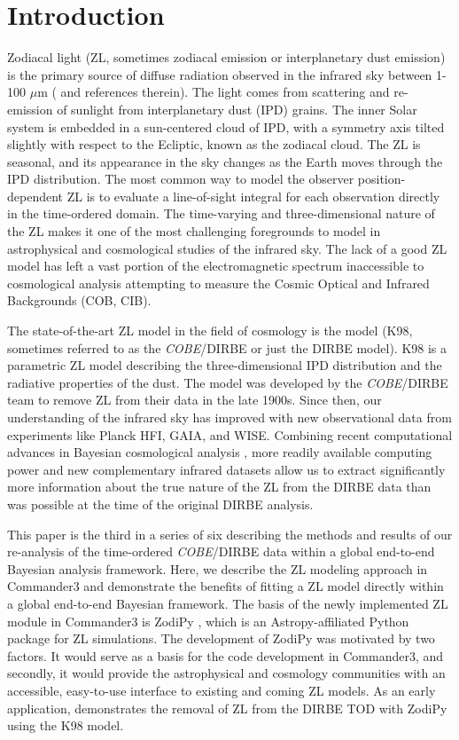 \documentclass[twocolumn]{aa}
\begin{document}
\section{Introduction}
Zodiacal light (ZL, sometimes zodiacal emission or interplanetary dust 
emission) is the primary source of diffuse radiation observed in the 
infrared sky between 1-100 $\mu$m (\cite{Leinert1998} and references 
therein). The light comes from scattering and re-emission of sunlight 
from interplanetary dust (IPD) grains. The inner Solar system is 
embedded in a sun-centered cloud of IPD, with a symmetry axis tilted 
slightly with respect to the Ecliptic, known as the zodiacal cloud. The 
ZL is seasonal, and its appearance in the sky changes as the Earth moves 
through the IPD distribution. The most common way to model the observer 
position-dependent ZL is to evaluate a line-of-sight integral for each 
observation directly in the time-ordered domain. The time-varying and 
three-dimensional nature of the ZL makes it one of the most challenging 
foregrounds to model in astrophysical and cosmological studies of the 
infrared sky. The lack of a good ZL model has left a vast portion of the 
electromagnetic spectrum inaccessible to cosmological analysis 
attempting to measure the Cosmic Optical and Infrared Backgrounds (COB, 
CIB). 

The state-of-the-art ZL model in the field of cosmology is the 
\cite{Kelsall1998} model (K98, sometimes referred to as the 
\textit{COBE}/DIRBE or just the DIRBE model). K98 is a parametric ZL 
model describing the three-dimensional IPD distribution and the 
radiative properties of the dust. The model was developed by the 
\textit{COBE}/DIRBE team to remove ZL from their data in the late 1900s.
 Since then, our understanding of the infrared sky has improved with new 
 observational data from experiments like Planck HFI, GAIA, and WISE. 
 Combining recent computational advances in Bayesian cosmological 
 analysis \citep{BP2023, Galloway2023, Watts2023}, more readily 
 available computing power and new complementary infrared datasets 
 allow us to extract significantly more information about the true 
 nature of the ZL from the DIRBE data than was possible at the time 
 of the original DIRBE analysis.

This paper is the third in a series of six describing the methods and 
results of our re-analysis of the time-ordered \textit{COBE}/DIRBE data 
within a global end-to-end Bayesian analysis framework. Here, we 
describe the ZL modeling approach in Commander3 and demonstrate the 
benefits of fitting a ZL model directly within a global end-to-end 
Bayesian framework. The basis of the newly implemented ZL module in 
Commander3 is ZodiPy \citep{San2024}, which is an Astropy-affiliated 
Python package for ZL simulations. The development of ZodiPy was 
motivated by two factors. It would serve as a basis for the code 
development in Commander3, and secondly, it would provide the 
astrophysical and cosmology communities with an accessible, easy-to-use 
interface to existing and coming ZL models. As an early application, 
\cite{San2022} demonstrates the removal of ZL from the DIRBE TOD with 
ZodiPy using the K98 model.
\end{document}
